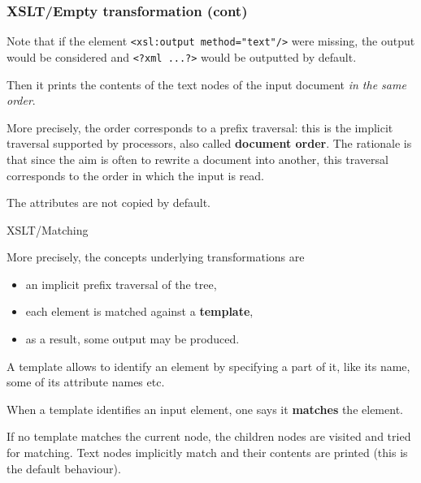 %
\begin{frame}[containsverbatim]
\frametitle{XSLT/Empty transformation (cont)}

Note that if the element \verb|<xsl:output method="text"/>| were
missing, the output would be considered \XML and \verb|<?xml ...?>|
would be outputted by default.

\bigskip

Then it prints the contents of the text nodes of the input \XML
document \emph{in the same order}.

\bigskip

More precisely, the order corresponds to a prefix traversal: this is
the implicit traversal supported by \XSLT processors, also called
\textbf{document order}. The rationale is that since the aim is often
to rewrite a document into another, this traversal corresponds to the
order in which the input is read.

\bigskip

The attributes are not copied by default.

\end{frame}

%
\begin{frame}{XSLT/Matching}

More precisely, the concepts underlying \XSLT transformations are
\begin{itemize}

  \item an implicit prefix traversal of the \XML tree,

  \item each element is matched against a \textbf{template},

  \item as a result, some output may be produced.

\end{itemize}
A template allows to identify an element by specifying a part of it,
like its name, some of its attribute names etc.

\bigskip

When a template identifies an input element, one says it
\textbf{matches} the element.

\bigskip

If no template matches the current node, the children nodes are
visited and tried for matching. Text nodes implicitly match and their
contents are printed (this is the default behaviour).

\end{frame}

